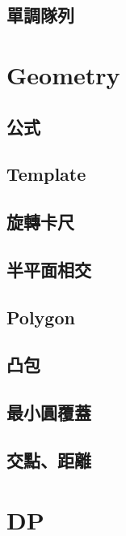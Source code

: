     \subsection{單調隊列}
        
        
\section{Geometry}
    \subsection{公式}
        
    \subsection{Template}
        
    \subsection{旋轉卡尺}
        
    \subsection{半平面相交}
        
    \subsection{Polygon}
        \subsection{凸包}
        
        \subsection{最小圓覆蓋}
        
        \subsection{交點、距離}
            

\section{DP}
